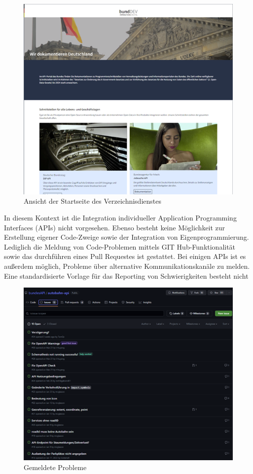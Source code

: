\documentclass[notitlepage, hidelinks]{article}
\begin{document}
\begin{figure}[H]
\centering
  \includegraphics[width=\textwidth]{images/bundwebsite.png}
  \caption{Ansicht der Startseite des Verzeichnisdienstes}
  \label{fig:}
\end{figure}

In diesem Kontext ist die Integration individueller Application Programming Interfaces (APIs) nicht vorgesehen. Ebenso besteht keine Möglichkeit zur Erstellung eigener Code-Zweige sowie der Integration von Eigenprogrammierung. Lediglich die Meldung von Code-Problemen mittels GIT Hub-Funktionalität sowie das durchführen eines Pull Requestes ist gestattet. Bei einigen APIs ist es außerdem möglich, Probleme über alternative Kommunikationskanäle zu melden. Eine standardisierte Vorlage für das Reporting von Schwierigkeiten besteht nicht

\begin{figure}[H]
\centering
  \includegraphics[width=\textwidth]{images/gitissues.png}
  \caption{Gemeldete Probleme}
  \label{fig:gitissues}
\end{figure}
\end{document}
